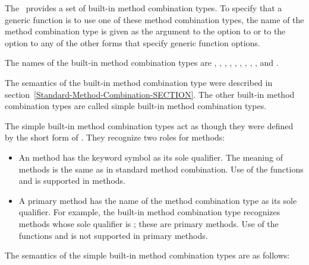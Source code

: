 The \CLOS\ provides a set of built-in method combination types.  To
specify that a generic function is to use one of these method
combination types, the name of the method combination type is given as
the argument to the  option to 
 or to the  option to any of the
other forms that specify generic function options.

The names of the built-in  method combination types are
\cdf{+}, , , , , , 
, , , and .

The semantics of the  built-in method combination type were
described in section~\ref{Standard-Method-Combination-SECTION}.  The other
built-in method combination types are called {\bit simple built-in method
combination types.}

The simple built-in method combination types act as though they were
defined by the short form of .  They
recognize two roles for methods:

\begin{itemize}

\item  An  method has the keyword symbol 
 as its sole qualifier.  The meaning of 
methods is the same as in standard method combination.  Use of the
functions  and  is supported
in  methods.

\item  A primary method has the name of the method combination
type as its sole qualifier.  For example, the built-in method
combination type  recognizes methods whose sole qualifier is
; these are primary methods. Use of the functions 
 and  is not supported in primary
methods.

\end{itemize}
The semantics of the simple built-in method combination types are as
follows:

